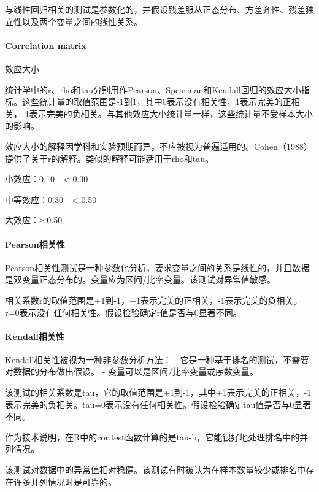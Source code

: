 \documentclass[]{book}
\let\oldparagraph\paragraph
\renewcommand{\paragraph}[1]{\oldparagraph{#1}\mbox{}}
\begin{document}
与线性回归相关的测试是参数化的，并假设残差服从正态分布、方差齐性、残差独立性以及两个变量之间的线性关系。

\hypertarget{correlation-matrix}{%
\paragraph{Correlation matrix}\label{correlation-matrix}}

效应大小

统计学中的r、rho和tau分别用作Pearson、Spearman和Kendall回归的效应大小指标。这些统计量的取值范围是-1到1，其中0表示没有相关性，1表示完美的正相关，-1表示完美的负相关。与其他效应大小统计量一样，这些统计量不受样本大小的影响。

效应大小的解释因学科和实验预期而异，不应被视为普遍适用的。Cohen（1988）提供了关于r的解释。类似的解释可能适用于rho和tau。

小效应：0.10 - \textless{} 0.30

中等效应：0.30 - \textless{} 0.50

大效应：≥ 0.50

\hypertarget{pearsonux76f8ux5173ux6027}{%
\paragraph{Pearson相关性}\label{pearsonux76f8ux5173ux6027}}

Pearson相关性测试是一种参数化分析，要求变量之间的关系是线性的，并且数据是双变量正态分布的。变量应为区间/比率变量。该测试对异常值敏感。

相关系数r的取值范围是+1到-1，+1表示完美的正相关，-1表示完美的负相关。r=0表示没有任何相关性。假设检验确定r值是否与0显著不同。

\hypertarget{kendallux76f8ux5173ux6027}{%
\paragraph{Kendall相关性}\label{kendallux76f8ux5173ux6027}}

Kendall相关性被视为一种非参数分析方法：
- 它是一种基于排名的测试，不需要对数据的分布做出假设。
- 变量可以是区间/比率变量或序数变量。

该测试的相关系数是tau，它的取值范围是+1到-1，其中+1表示完美的正相关，-1表示完美的负相关。tau=0表示没有任何相关性。假设检验确定tau值是否与0显著不同。

作为技术说明，在R中的cor.test函数计算的是tau-b，它能很好地处理排名中的并列情况。

该测试对数据中的异常值相对稳健。该测试有时被认为在样本数量较少或排名中存在许多并列情况时是可靠的。
\end{document}
